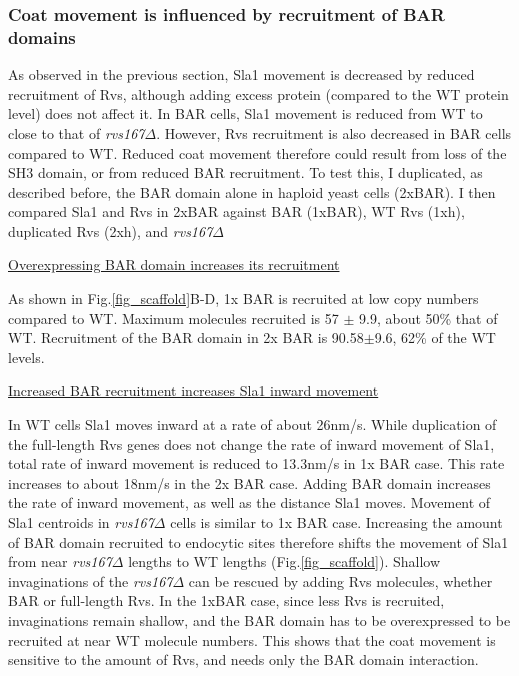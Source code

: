 	\subsubsection{Coat movement is influenced by recruitment of BAR domains }
As observed in the previous section, Sla1 movement is decreased by reduced recruitment of Rvs, although adding excess protein (compared to the WT protein level) does not affect it. In BAR cells, Sla1 movement is reduced from WT to close to that of \textit{rvs167$\Delta$}. However, Rvs recruitment is also decreased in BAR cells compared to WT. Reduced coat movement therefore could result from loss of the SH3 domain, or from reduced BAR recruitment. To test this, I duplicated, as described before, the BAR domain alone in haploid yeast cells (2xBAR). I then compared Sla1 and Rvs in 2xBAR against BAR (1xBAR), WT Rvs (1xh), duplicated Rvs (2xh), and \textit{rvs167$\Delta$}

	\vspace{5mm}
	\underline{Overexpressing BAR domain increases its recruitment}
	
 As shown in Fig.\ref{fig_scaffold}B-D, 1x BAR is recruited at low copy numbers compared to WT. Maximum molecules recruited is 57 $\pm$ 9.9, about 50\% that of WT. Recruitment of the BAR domain in 2x BAR is 90.58$\pm$9.6, 62\% of the WT levels. 
 
	\vspace{5mm}
		\underline{Increased BAR recruitment increases Sla1 inward movement}
					
In WT cells Sla1 moves inward at a rate of about 26nm/s. While duplication of the full-length Rvs genes does not change the rate of inward movement of Sla1, total rate of inward movement is reduced to 13.3nm/s in 1x BAR case. This rate increases to about 18nm/s in the 2x BAR case. Adding BAR domain increases the rate of inward movement, as well as the distance Sla1 moves. Movement of Sla1 centroids in \textit{rvs167$\Delta$} cells is similar to 1x BAR case. Increasing the amount of BAR domain recruited to endocytic sites therefore shifts the movement of Sla1 from near \textit{rvs167$\Delta$} lengths to WT lengths (Fig.\ref{fig_scaffold}). Shallow invaginations of the \textit{rvs167$\Delta$} can be rescued by adding Rvs molecules, whether BAR or full-length Rvs. In the 1xBAR case, since less Rvs is recruited, invaginations remain shallow, and the BAR domain has to be overexpressed to be recruited at near WT molecule numbers.
This shows that the coat movement is sensitive to the amount of Rvs, and needs only the BAR domain interaction.



